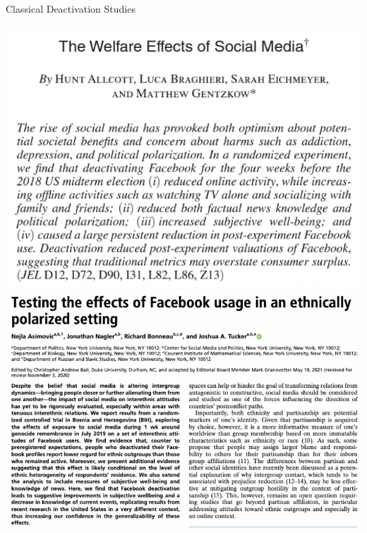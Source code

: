 \documentclass[usenames,dvipsnames,t]{beamer}
\begin{document}
\begin{frame}{Classical Deactivation Studies} \small  

\vspace*{\fill}

\centering
\includegraphics[scale=.2]{deactivation_studies_allcott} \hspace{.25cm}
\includegraphics[scale=.2]{deactivation_studies_asimovic}

\vspace*{\fill}

\end{frame}
\end{document}
